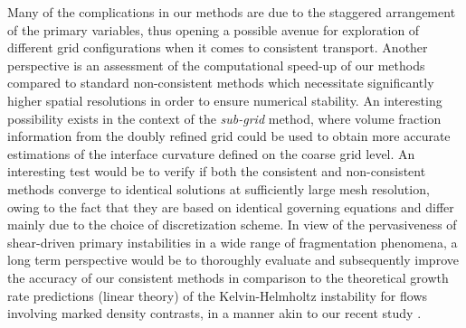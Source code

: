 Many of the complications in our methods are due to the staggered arrangement of the primary variables, 
thus opening a possible avenue for exploration of different grid configurations when it comes to consistent transport.
Another perspective is an assessment of the computational speed-up 
of our methods compared to standard non-consistent methods which necessitate 
significantly higher spatial resolutions in order to ensure numerical stability.  
An interesting possibility exists in the context of the \textit{sub-grid} method, 
where volume fraction information from the doubly refined grid could be used to
obtain more accurate estimations of the interface curvature defined on the coarse grid level. 
An interesting test would be to verify if both the consistent and non-consistent methods
converge to identical solutions at sufficiently large mesh resolution, owing to the fact that they 
are based on identical governing equations and differ mainly due to the choice of discretization scheme. 
In view of the pervasiveness of shear-driven primary instabilities in a wide range 
of fragmentation phenomena, a long term perspective would be to thoroughly evaluate 
and subsequently improve the accuracy of our consistent methods in comparison to the theoretical 
growth rate predictions (linear theory) of the Kelvin-Helmholtz instability for flows
involving marked density contrasts, in a manner akin to our recent study \cite{caf_momcons}. 

